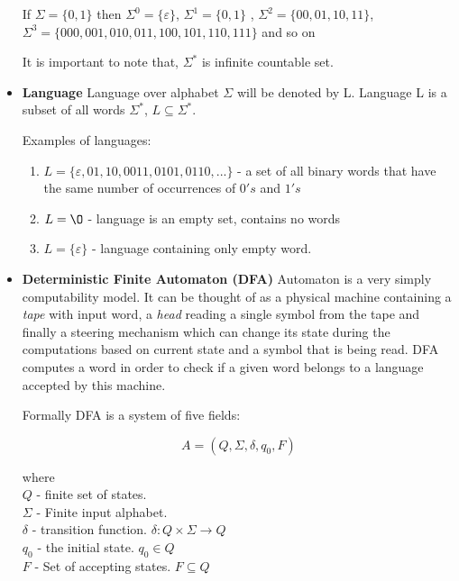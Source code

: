 \documentclass{article}
\begin{document}
\begin{itemize}
If $\Sigma = \{0,1\}$
then $\Sigma^0 = \{\varepsilon \}$, $\Sigma^1 = \{0,1\}$ , $\Sigma^2 = \{00, 01 ,10 ,11\}$,
$\Sigma^3 = \{000, 001, 010, 011, 100, 101, 110, 111\}$ and so on

It is important to note that, $\Sigma^*$ is infinite countable set.


\item {\bf Language}
Language over alphabet $\Sigma$ will be denoted by L.
Language L is a subset of all words $\Sigma^*$, $L \subseteq \Sigma^*$.

Examples of languages:
\begin{enumerate}

	\item 
	$L = \{\varepsilon, 01, 10, 0011, 0101, 0110, ...\}$ -
	a set of all binary words that have the same number of occurrences of $0's$ 	and $1's$
	
	\item 	$L = \O$ - language is an empty set, contains no words
	
	\item 	$L = \{\varepsilon \}$ - language containing only empty word.

\end{enumerate}




\item {\bf Deterministic Finite Automaton (DFA)}
Automaton is a very simply computability model.
It can be thought of as a physical machine containing a \textit{tape} with input word, a \textit{head} reading a single symbol from the tape and finally a steering mechanism which can change its state during the computations based on current state and a symbol that is being read.
DFA computes a word in order to check if a given word belongs to a language accepted by this machine.

Formally DFA is a system of five fields:

\begin{equation}
	A = (Q, \Sigma, \delta, q_0, F)
\end{equation}

where \\
$Q$ - finite set of states. \\
$\Sigma$ - Finite input alphabet. \\
$\delta$ - transition function. $\delta: Q \times \Sigma \rightarrow Q$ \\
$q_0$ - the initial state. $q_0 \in Q$ \\
$F$ - Set of accepting states. $F \subseteq Q$ \\



\end{itemize}
\end{document}
